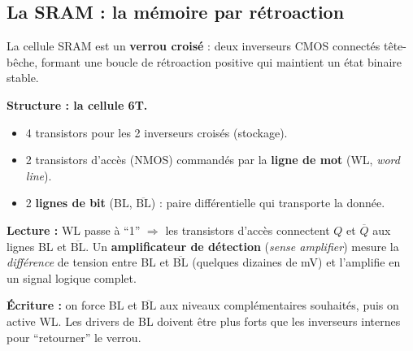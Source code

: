 \documentclass[12pt,a4paper,twoside]{book}
\begin{document}
\subsection{La SRAM : la mémoire par rétroaction}

La cellule SRAM est un \textbf{verrou croisé} : deux inverseurs CMOS connectés tête-bêche, formant une boucle de rétroaction positive qui maintient un état binaire stable.

\begin{center}
\end{center}

\begin{formule}
\textbf{Structure : la cellule 6T.}

\begin{itemize}[nosep]
\item 4 transistors pour les 2 inverseurs croisés (stockage).
\item 2 transistors d'accès (NMOS) commandés par la \textbf{ligne de mot} (WL, \textit{word line}).
\item 2 \textbf{lignes de bit} (BL, $\overline{\text{BL}}$) : paire différentielle qui transporte la donnée.
\end{itemize}

\textbf{Lecture :} WL passe à ``1'' $\Rightarrow$ les transistors d'accès connectent $Q$ et $\overline{Q}$ aux lignes BL et $\overline{\text{BL}}$. Un \textbf{amplificateur de détection} (\textit{sense amplifier}) mesure la \textit{différence} de tension entre BL et $\overline{\text{BL}}$ (quelques dizaines de mV) et l'amplifie en un signal logique complet.

\textbf{Écriture :} on force BL et $\overline{\text{BL}}$ aux niveaux complémentaires souhaités, puis on active WL. Les drivers de BL doivent être plus forts que les inverseurs internes pour ``retourner'' le verrou.
\end{formule}
\end{document}

